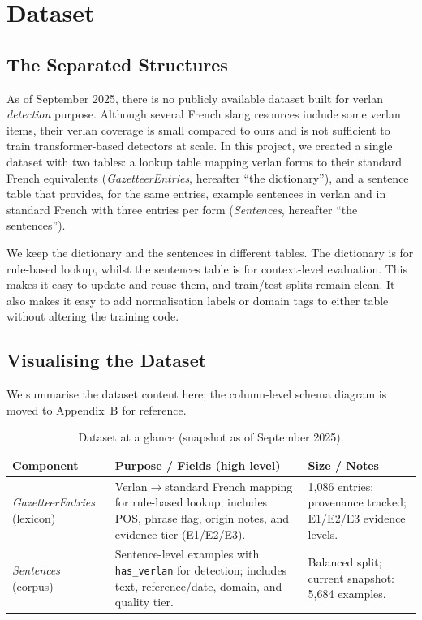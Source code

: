 \documentclass[12pt]{article}
\begin{document}
\section{Dataset}
\subsection{The Separated Structures}
As of September 2025, there is no publicly available dataset built for verlan \textit{detection} purpose. Although several French slang resources include some verlan items, their verlan coverage is small compared to ours and is not sufficient to train transformer-based detectors at scale. In this project, we created a single dataset with two tables: a lookup table mapping verlan forms to their standard French equivalents (\textit{GazetteerEntries}, hereafter ``the dictionary''), and a sentence table that provides, for the same entries, example sentences in verlan and in standard French with three entries per form (\textit{Sentences}, hereafter ``the sentences''). 

We keep the dictionary and the sentences in different tables. The dictionary is for rule-based lookup, whilst the sentences table is for context-level evaluation. This makes it easy to update and reuse them, and train/test splits remain clean. It also makes it easy to add normalisation labels or domain tags to either table without altering the training code.

\subsection{Visualising the Dataset}

We summarise the dataset content here; the column-level schema diagram is moved to Appendix~B for reference.

\begin{table}[H]
\centering
\caption{Dataset at a glance (snapshot as of September 2025).}
\begin{tabular}{p{3.6cm} p{7.2cm} p{3.6cm}}
\hline
\textbf{Component} & \textbf{Purpose / Fields (high level)} & \textbf{Size / Notes} \\
\hline
\textit{GazetteerEntries} (lexicon) & Verlan$\rightarrow$standard French mapping for rule-based lookup; includes POS, phrase flag, origin notes, and evidence tier (E1/E2/E3). & 1,086 entries; provenance tracked; E1/E2/E3 evidence levels. \\
\textit{Sentences} (corpus) & Sentence-level examples with \texttt{has\_verlan} for detection; includes text, reference/date, domain, and quality tier. & Balanced split; current snapshot: 5,684 examples. \\
\hline
\end{tabular}
\label{tab:dataset-glance}
\end{table}
\end{document}
